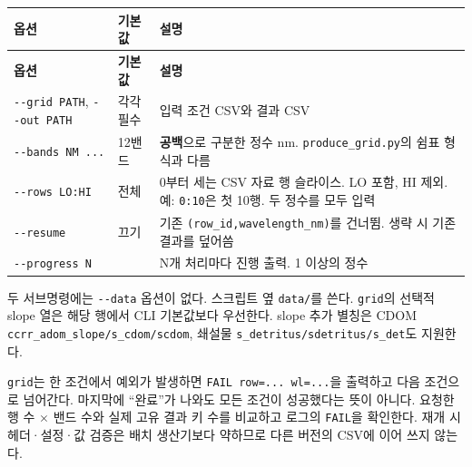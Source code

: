 {\TableFont
\begin{longtable}{@{}>{\raggedright\arraybackslash}p{}>{\raggedright\arraybackslash}p{}>{\raggedright\arraybackslash}p{}@{}}
\toprule
\textbf{옵션} & \textbf{기본값} & \textbf{설명} \\
\midrule
\endfirsthead
\toprule
\textbf{옵션} & \textbf{기본값} & \textbf{설명} \\
\midrule
\endhead
\bottomrule
\endfoot
\texttt{-\allowbreak{}-\allowbreak{}grid PATH}, \texttt{-\allowbreak{}-\allowbreak{}out PATH} & 각각 필수 & 입력 조건 CSV와 결과 CSV \\
\texttt{-\allowbreak{}-\allowbreak{}bands NM .\allowbreak{}.\allowbreak{}.\allowbreak{}} & 12밴드 & \textbf{공백}으로 구분한 정수 nm. \texttt{produce\_\allowbreak{}grid.\allowbreak{}py}의 쉼표 형식과 다름 \\
\texttt{-\allowbreak{}-\allowbreak{}rows LO:\allowbreak{}HI} & 전체 & 0부터 세는 CSV 자료 행 슬라이스. LO 포함, HI 제외. 예: \texttt{0:\allowbreak{}10}은 첫 10행. 두 정수를 모두 입력 \\
\texttt{-\allowbreak{}-\allowbreak{}resume} & 끄기 & 기존 \texttt{(row\_\allowbreak{}id,\allowbreak{}wavelength\_\allowbreak{}nm)}를 건너뜀. 생략 시 기존 결과를 덮어씀 \\
\texttt{-\allowbreak{}-\allowbreak{}progress N} & 1 & N개 처리마다 진행 출력. 1 이상의 정수 \\
\end{longtable}
}

두 서브명령에는 \texttt{-\allowbreak{}-\allowbreak{}data} 옵션이 없다. 스크립트 옆 \texttt{data/\allowbreak{}}를 쓴다. \texttt{grid}의 선택적 slope 열은 해당 행에서 CLI 기본값보다 우선한다. slope 추가 별칭은 CDOM \texttt{ccrr\_\allowbreak{}adom\_\allowbreak{}slope/\allowbreak{}s\_\allowbreak{}cdom/\allowbreak{}scdom}, 쇄설물 \texttt{s\_\allowbreak{}detritus/\allowbreak{}sdetritus/\allowbreak{}s\_\allowbreak{}det}도 지원한다.

\texttt{grid}는 한 조건에서 예외가 발생하면 \texttt{FAIL row=\allowbreak{}.\allowbreak{}.\allowbreak{}.\allowbreak{} wl=\allowbreak{}.\allowbreak{}.\allowbreak{}.\allowbreak{}}을 출력하고 다음 조건으로 넘어간다. 마지막에 “완료”가 나와도 모든 조건이 성공했다는 뜻이 아니다. 요청한 행 수 \ensuremath{\times} 밴드 수와 실제 고유 결과 키 수를 비교하고 로그의 \texttt{FAIL}을 확인한다. 재개 시 헤더·설정·값 검증은 배치 생산기보다 약하므로 다른 버전의 CSV에 이어 쓰지 않는다.

